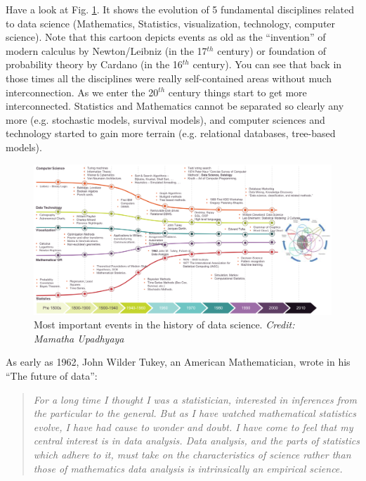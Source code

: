 \documentclass[10pt]{PhDthesisPSnPDF}%
\begin{document}
Have a look at Fig. \ref{fig:Analytics}. It shows the evolution of 5 fundamental disciplines related to data science (Mathematics, Statistics, visualization, technology, computer science). Note that this cartoon depicts events as old as the ``invention'' of modern calculus by Newton/Leibniz (in the 17$^{th}$ century) or foundation of probability theory by Cardano (in the 16$^{th}$ century). You can see that back in those times all the disciplines were really self-contained areas without much interconnection. As we enter the 20$^{th}$ century things start to get more interconnected. Statistics and Mathematics cannot be separated so clearly any more (e.g. stochastic models, survival models), and computer sciences and technology started to gain more terrain (e.g. relational databases, tree-based models). 
\newpage
\begin{figure}[h]
	\begin{center}
			\includegraphics[scale=0.25]{HistoryCH1}
	\end{center}
	\caption{Most important events in the history of data science. \textit{Credit: Mamatha Upadhyaya}}
	\label{fig:Analytics}
\end{figure} 

As early as 1962, John Wilder Tukey, an American Mathematician, wrote in his ``The future of data'':
\begin{quotation}
\textit{For a long time I thought I was a statistician, interested in inferences from the particular to the general. But as I have watched mathematical statistics evolve, I have had cause to wonder and doubt. I have come to feel that my central interest is in data analysis. Data analysis, and the parts of statistics which adhere to it, must take on the characteristics of science rather than those of mathematics data analysis is intrinsically an empirical science.}
\end{quotation} 
 
\end{document}
